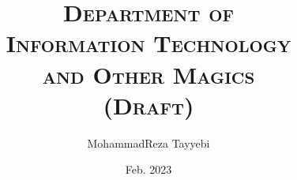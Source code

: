 \documentclass[a4paper,12pt]{book}
\begin{document}
\author{MohammadReza Tayyebi}
\title{\textsc{Department of\\Information Technology\\and Other Magics\\(Draft)}}
\date{Feb. 2023}

\frontmatter
\maketitle



\tableofcontents

\mainmatter





\backmatter
\end{document}
